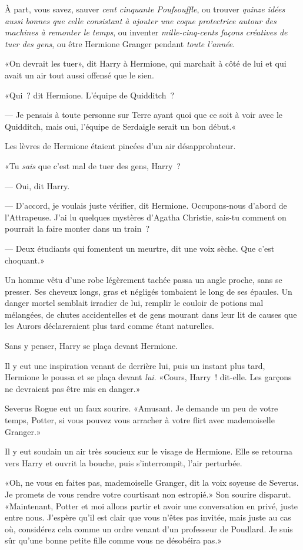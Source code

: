 À part, vous savez, sauver \emph{cent cinquante Poufsouffle}, ou trouver \emph{quinze idées aussi bonnes que celle consistant à ajouter une coque protectrice autour des machines à remonter le temps}, ou inventer \emph{mille-cinq-cents façons créatives de tuer des gens}, ou être Hermione Granger pendant \emph{toute l'année}.

«On devrait les tuer», dit Harry à Hermione, qui marchait à côté de lui et qui avait un air tout aussi offensé que le sien.

«Qui~? dit Hermione. L'équipe de Quidditch~?

--- Je pensais à toute personne sur Terre ayant quoi que ce soit à voir avec le Quidditch, mais oui, l'équipe de Serdaigle serait un bon début.«

Les lèvres de Hermione étaient pincées d'un air désapprobateur.

«Tu \emph{sais} que c'est mal de tuer des gens, Harry~?

--- Oui, dit Harry.

--- D'accord, je voulais juste vérifier, dit Hermione. Occupons-nous d'abord de l'Attrapeuse. J'ai lu quelques mystères d'Agatha Christie, sais-tu comment on pourrait la faire monter dans un train~?

--- Deux étudiants qui fomentent un meurtre, dit une voix sèche. Que c'est choquant.»

Un homme vêtu d’une robe légèrement tachée passa un angle proche, sans se presser. Ses cheveux longs, gras et négligés tombaient le long de ses épaules. Un danger mortel semblait irradier de lui, remplir le couloir de potions mal mélangées, de chutes accidentelles et de gens mourant dans leur lit de causes que les Aurors déclareraient plus tard comme étant naturelles.

Sans y penser, Harry se plaça devant Hermione.

Il y eut une inspiration venant de derrière lui, puis un instant plus tard, Hermione le poussa et se plaça devant \emph{lui}. «Cours, Harry~! dit-elle. Les garçons ne devraient pas être mis en danger.»

Severus Rogue eut un faux sourire. «Amusant. Je demande un peu de votre temps, Potter, si vous pouvez vous arracher à votre flirt avec mademoiselle Granger.»

Il y eut soudain un air très soucieux sur le visage de Hermione. Elle se retourna vers Harry et ouvrit la bouche, puis s'interrompit, l'air perturbée.

«Oh, ne vous en faites pas, mademoiselle Granger, dit la voix soyeuse de Severus. Je promets de vous rendre votre courtisant non estropié.» Son sourire disparut. «Maintenant, Potter et moi allons partir et avoir une conversation en privé, juste entre nous. J'espère qu'il est clair que vous n'êtes pas invitée, mais juste au cas où, considérez cela comme un ordre venant d'un professeur de Poudlard. Je suis sûr qu'une bonne petite fille comme vous ne désobéira pas.»

